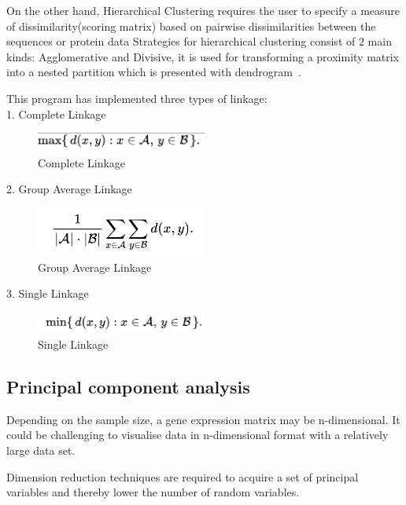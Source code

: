 \documentclass[]{final_report}
\begin{document}
On the other hand, Hierarchical Clustering requires the user to specify a measure of dissimilarity(scoring matrix) based on pairwise dissimilarities between the sequences or protein data Strategies for hierarchical clustering consist of 2 main kinds: Agglomerative and Divisive, it is used for transforming a proximity matrix into a nested partition which is presented with dendrogram~\cite{franklin2005elements}.

This program has implemented three types of linkage:\\
1. Complete Linkage\\
\begin{figure}[H]
    \centering
    \includegraphics[width=0.5\textwidth]{CompleteLinkage.png}
    \caption{Complete Linkage}
    \label{fig:complete_linkage}
\end{figure}
2. Group Average Linkage\\
\begin{figure}[H]
    \centering
    \includegraphics[width=0.5\textwidth]{Aveerage Linkage.png}
    \caption{Group Average Linkage}
    \label{fig:grp_avg_linkage}
\end{figure}
3. Single Linkage
\begin{figure}[H]
    \centering
    \includegraphics[width=0.5\textwidth]{Single Linkage.png}
    \caption{Single Linkage}
    \label{fig:single_linkage}
\end{figure}

\subsection{Principal component analysis}
Depending on the sample size, a gene expression matrix may be n-dimensional. It could be challenging to visualise data in n-dimensional format with a relatively large data set.

Dimension reduction techniques are required to acquire a set of principal variables and thereby lower the number of random variables.
\end{document}
